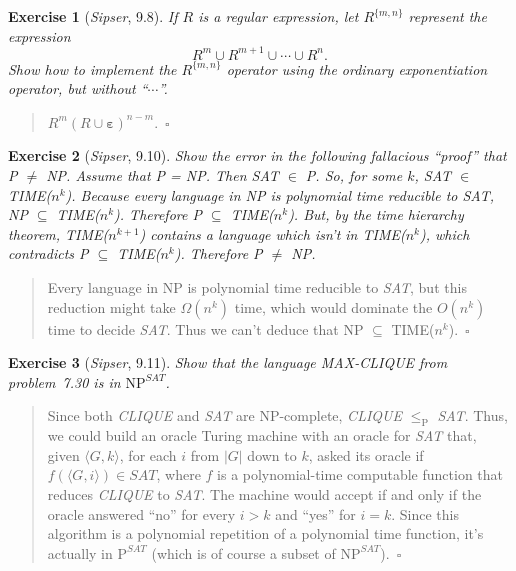 \documentclass{article}
\theoremstyle{break}			%
\newtheorem{exercise}{Exercise}
\theoremstyle{plain}
\newenvironment{answer}{\begin{quotation}\noindent}{\end{quotation}}
\newcommand{\sipser}{\textit{Sipser}}
\newcommand{\encoding}[1]{\ensuremath{\langle#1\rangle}}
\newcommand{\qed}{~\ensuremath{\square}}
\newcommand{\set}[1]{\ensuremath{\{#1\}}}
\newcommand{\union}{\cup}
\newcommand{\setname}[1]{\textit{#1}}
\renewcommand{\P}{\textrm{P}}
\newcommand{\NP}{\textrm{NP}}
\newcommand{\emptystring}{\ensuremath{\boldsymbol\varepsilon}}
\begin{document}
\addtocounter{exercise}{-1}
\begin{exercise}[\sipser, 9.8]
If $R$ is a regular expression, let $R^{\set{m,n}}$ represent the
expression \[R^m\union R^{m+1}\union\cdots\union R^n.\]
Show how to implement the $R^{\set{m,n}}$ operator using the ordinary
exponentiation operator, but without ``$\cdots$''.
\end{exercise}
\begin{answer}
$R^m(R\union\emptystring)^{n-m}.$\qed
\end{answer}

\begin{exercise}[\sipser, 9.10]
Show the error in the following fallacious ``proof'' that P $\not=$ NP.
Assume that P = NP.  Then \setname{SAT} $\in$ P.  So, for some $k$,
\setname{SAT} $\in$ TIME($n^k$).  Because every language in NP is
polynomial time reducible to \setname{SAT}, NP $\subseteq$
TIME($n^k$).  Therefore P $\subseteq$ TIME($n^k$).  But, by the time
hierarchy theorem, TIME($n^{k+1}$) contains a language which isn't in
TIME($n^k$), which contradicts P $\subseteq$ TIME($n^k$).  Therefore P
$\not=$ NP.
\end{exercise}
\begin{answer}
Every language in NP is polynomial time reducible to \setname{SAT},
but this reduction might take $\Omega(n^k)$ time, which would dominate
the $O(n^k)$ time to decide \setname{SAT}.  Thus we can't deduce that
NP $\subseteq$ TIME($n^k$).\qed
\end{answer}

\begin{exercise}[\sipser, 9.11]
Show that the language \setname{MAX-CLIQUE} from problem~7.30 is in
$\NP^{\setname{SAT}}$.
\end{exercise}
\begin{answer}
Since both \setname{CLIQUE} and \setname{SAT} are NP-complete,
\setname{CLIQUE} $\leq_{\text{P}}$ \setname{SAT}.  Thus, we could
build an oracle Turing machine with an oracle for \setname{SAT} that,
given $\encoding{G,k}$, for each $i$ from $|G|$ down to $k$, asked its
oracle if $f(\encoding{G,i})\in\setname{SAT}$, where $f$ is a
polynomial-time computable function that reduces \setname{CLIQUE} to
\setname{SAT}.  The machine would accept if and only if the oracle
answered ``no'' for every $i>k$ and ``yes'' for $i=k$.  Since this
algorithm is a polynomial repetition of a polynomial time function,
it's actually in $\P^{\setname{SAT}}$ (which is of course a subset of
$\NP^{\setname{SAT}}$).\qed
\end{answer}
\end{document}

